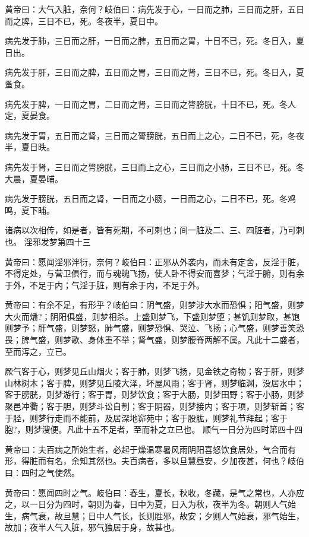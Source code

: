 \documentclass[a4paper,12pt,UTF8,twoside]{ctexbook}
\begin{document}
	黄帝曰：大气入脏，奈何？岐伯曰：病先发于心，一日而之肺，三日而之肝，五日而之脾，三日不已，死。冬夜半，夏日中。
	
	病先发于肺，三日而之肝，一日而之脾，五日而之胃，十日不已，死。冬日入，夏日出。
	
	病先发于肝，三日而之脾，五日而之胃，三日而之肾，三日不已，死。冬日入，夏蚤食。
	
	病先发于脾，一日而之胃，二日而之肾，三日而之膂膀胱，十日不已，死。冬人定，夏晏食。
	
	病先发于胃，五日而之肾，三日而之膂膀胱，五日而上之心，二日不已，死，冬夜半，夏日昳。
	
	病先发于肾，三日而之膂膀胱，三日而上之心，三日而之小肠，三日不已，死。冬大晨，夏晏晡。
	
	病先发于膀胱，五日而之肾，一日而之小肠，一日而之心，二日不已，死。冬鸡鸣，夏下晡。
	
	诸病以次相传，如是者，皆有死期，不可刺也；间一脏及二、三、四脏者，乃可刺也。
	淫邪发梦第四十三
	
	黄帝曰：愿闻淫邪泮衍，奈何？岐伯曰：正邪从外袭内，而未有定舍，反淫于脏，不得定处，与营卫俱行，而与魂魄飞扬，使人卧不得安而喜梦；气淫于腑，则有余于外，不足于内；气淫于脏，则有余于内，不足于外。
	
	黄帝曰：有余不足，有形乎？岐伯曰：阴气盛，则梦涉大水而恐惧；阳气盛，则梦大火而燔?；阴阳俱盛，则梦相杀。上盛则梦飞，下盛则梦堕；甚饥则梦取，甚饱则梦予；肝气盛，则梦怒，肺气盛，则梦恐惧、哭泣、飞扬；心气盛，则梦善笑恐畏；脾气盛，则梦歌、身体重不举；肾气盛，则梦腰脊两解不属。凡此十二盛者，至而泻之，立已。
	
	厥气客于心，则梦见丘山烟火；客于肺，则梦飞扬，见金铁之奇物；客于肝，则梦山林树木；客于脾，则梦见丘陵大泽，坏屋风雨；客于肾，则梦临渊，没居水中；客于膀胱，则梦游行；客于胃，则梦饮食；客于大肠，则梦田野；客于小肠，则梦聚邑冲衢；客于胆，则梦斗讼自刳；客于阴器，则梦接内；客于项，则梦斩首；客于胫，则梦行走而不能前，及居深地窌苑中；客于股肱，则梦礼节拜起；客于胞?，则梦溲便。凡此十五不足者，至而补之立已也。
	顺气一日分为四时第四十四
	
	黄帝曰：夫百病之所始生者，必起于燥温寒暑风雨阴阳喜怒饮食居处，气合而有形，得脏而有名，余知其然也。夫百病者，多以旦慧昼安，夕加夜甚，何也？岐伯曰：四时之气使然。
	
	黄帝曰：愿闻四时之气。岐伯曰：春生，夏长，秋收，冬藏，是气之常也，人亦应之，以一日分为四时，朝则为春，日中为夏，日入为秋，夜半为冬。朝则人气始生，病气衰，故旦慧；日中人气长，长则胜邪，故安；夕则人气始衰，邪气始生，故加；夜半人气入脏，邪气独居于身，故甚也。
	
\end{document}
